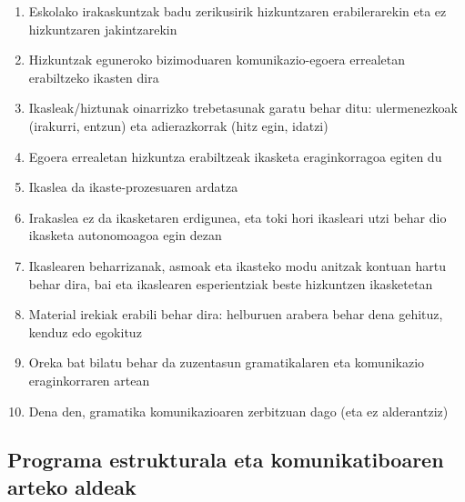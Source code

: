 \documentclass[
]{book}
\providecommand{\tightlist}{%
  \setlength{\itemsep}{0pt}\setlength{\parskip}{0pt}}
\begin{document}
\begin{enumerate}
\def\labelenumi{\arabic{enumi}.}
\tightlist
\item
  Eskolako irakaskuntzak badu zerikusirik hizkuntzaren erabilerarekin eta ez hizkuntzaren jakintzarekin
\item
  Hizkuntzak eguneroko bizimoduaren komunikazio-egoera errealetan erabiltzeko ikasten dira
\item
  Ikasleak/hiztunak oinarrizko trebetasunak garatu behar ditu: ulermenezkoak (irakurri, entzun) eta adierazkorrak (hitz egin, idatzi)
\item
  Egoera errealetan hizkuntza erabiltzeak ikasketa eraginkorragoa egiten du
\item
  Ikaslea da ikaste-prozesuaren ardatza
\item
  Irakaslea ez da ikasketaren erdigunea, eta toki hori ikasleari utzi behar dio ikasketa autonomoagoa egin dezan
\item
  Ikaslearen beharrizanak, asmoak eta ikasteko modu anitzak kontuan hartu behar dira, bai eta ikaslearen esperientziak beste hizkuntzen ikasketetan
\item
  Material irekiak erabili behar dira: helburuen arabera behar dena gehituz, kenduz edo egokituz
\item
  Oreka bat bilatu behar da zuzentasun gramatikalaren eta komunikazio eraginkorraren artean
\item
  Dena den, gramatika komunikazioaren zerbitzuan dago (eta ez alderantziz)
\end{enumerate}

\hypertarget{programa-estrukturala-eta-komunikatiboaren-arteko-aldeak}{%
\subsection{Programa estrukturala eta komunikatiboaren arteko aldeak}\label{programa-estrukturala-eta-komunikatiboaren-arteko-aldeak}}
\end{document}
